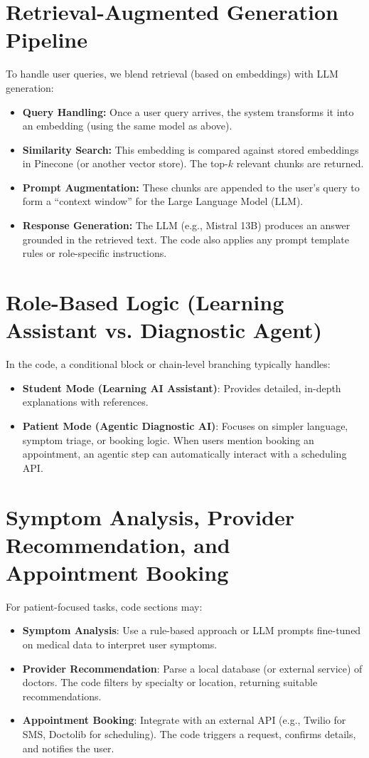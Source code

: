 \section{Retrieval-Augmented Generation Pipeline}
\label{sec:rag-pipeline}
To handle user queries, we blend retrieval (based on embeddings) with LLM generation:
\begin{itemize}
    \item \textbf{Query Handling:} Once a user query arrives, the system transforms it into an embedding (using the same model as above).
    \item \textbf{Similarity Search:} This embedding is compared against stored embeddings in Pinecone (or another vector store). The top-$k$ relevant chunks are returned.
    \item \textbf{Prompt Augmentation:} These chunks are appended to the user’s query to form a “context window” for the Large Language Model (LLM).
    \item \textbf{Response Generation:} The LLM (e.g., Mistral 13B) produces an answer grounded in the retrieved text. The code also applies any prompt template rules or role-specific instructions.
\end{itemize}

\section{Role-Based Logic (Learning Assistant vs. Diagnostic Agent)}
\label{sec:role-logic}
In the code, a conditional block or chain-level branching typically handles:
\begin{itemize}
    \item \textbf{Student Mode (Learning AI Assistant)}:  
    Provides detailed, in-depth explanations with references.
    \item \textbf{Patient Mode (Agentic Diagnostic AI)}:  
    Focuses on simpler language, symptom triage, or booking logic. 
    When users mention booking an appointment, an agentic step can automatically interact with a scheduling API.
\end{itemize}

\section{Symptom Analysis, Provider Recommendation, and Appointment Booking}
\label{sec:extended-capabilities}



For patient-focused tasks, code sections may:
\begin{itemize}
    \item \textbf{Symptom Analysis}: Use a rule-based approach or LLM prompts fine-tuned on medical data to interpret user symptoms.
    \item \textbf{Provider Recommendation}: Parse a local database (or external service) of doctors. The code filters by specialty or location, returning suitable recommendations.
    \item \textbf{Appointment Booking}: Integrate with an external API (e.g., Twilio for SMS, Doctolib for scheduling). The code triggers a request, confirms details, and notifies the user.
\end{itemize}


